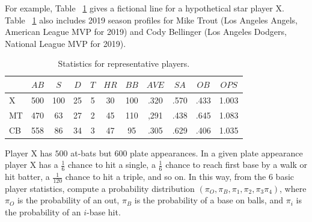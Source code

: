 \documentclass[12pt]{article}
\begin{document}
For example, Table~%
\ref{tab:baseball:stats} gives a fictional line for a hypothetical star
player X. Table~%
\ref{tab:baseball:stats} also includes 2019 season profiles for Mike
Trout (Los Angeles Angels, American League MVP for 2019) and Cody
Bellinger (Los Angeles Dodgers, National League MVP for 2019).
\begin{table}
    \centering
    \begin{tabular}{lcccccccccc}
        \toprule          & \(\mathit{AB}\)   & \(S\)   & \(D\)   & \(T\)   & \(\mathit{HR}\)   & \(\mathit{BB}\)   & \(\mathit{AVE}\)  & \(SA\)      & \(OB\)   & \(OPS\)   \\ 
        \midrule X        & 500  & 100 & 25  & 5   & 30   & 100  & .320 & .570    & .433 & 1.003 \\ 
        MT                & 470  & 63  & 27  & 2   & 45   & 110  & ,291 & .438    & .645 & 1.083 \\ 
        CB                & 558  & 86  & 34  & 3   & 47   & 95   & .305 & .629    & .406 & 1.035 \\ 
        \bottomrule
    \end{tabular}
    \caption{Statistics for representative players.}%
    \label{tab:baseball:stats}
\end{table}
Player X has \( 500 \) at-bats but \( 600 \) plate appearances.  In a
given plate appearance player X has a \( \frac{1}{6} \) chance to hit a
single, a \( \frac{1}{6} \) chance to reach first base by a walk or hit
batter, a \( \frac{1}{120} \) chance to hit a triple, and so on.  In
this way, from the \( 6 \) basic player statistics, compute a
probability distribution \( (\pi_O, \pi_B, \pi_1, \pi_2, \pi_3 \pi_4) \),
where \( \pi_O \) is the probability of an out, \( \pi_B \) is the
probability of a base on balls, and \( \pi_i \) is the probability of an
\( i \)-base hit.
\end{document}

